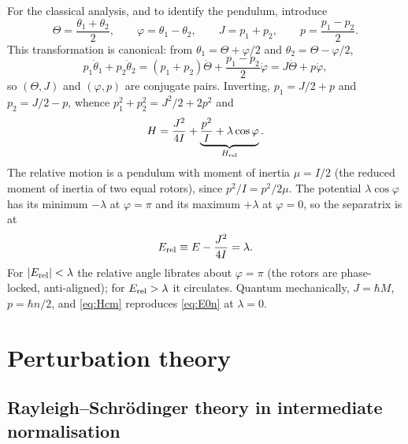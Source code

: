 \documentclass[preprint,12pt]{elsarticle}
\newcommand{\Erel}{E_{\rm rel}}
\begin{document}
For the classical analysis, and to identify the pendulum, introduce
\begin{equation}
\Theta=\frac{\theta_{1}+\theta_{2}}{2},\qquad
\varphi=\theta_{1}-\theta_{2},\qquad
J=p_{1}+p_{2},\qquad
p=\frac{p_{1}-p_{2}}{2}.
\label{eq:cmrel}
\end{equation}
This transformation is canonical: from $\theta_{1}=\Theta+\varphi/2$ and
$\theta_{2}=\Theta-\varphi/2$,
\begin{equation}
p_{1}\dot\theta_{1}+p_{2}\dot\theta_{2}
=(p_{1}+p_{2})\dot\Theta+\frac{p_{1}-p_{2}}{2}\dot\varphi
=J\dot\Theta+p\dot\varphi,
\end{equation}
so $(\Theta,J)$ and $(\varphi,p)$ are conjugate pairs. Inverting,
$p_{1}=J/2+p$ and $p_{2}=J/2-p$, whence
$p_{1}^{2}+p_{2}^{2}=J^{2}/2+2p^{2}$ and
\begin{equation}
H=\frac{J^{2}}{4I}+\underbrace{\frac{p^{2}}{I}+\lambda\cos\varphi}_{H_{\rm rel}} .
\label{eq:Hcm}
\end{equation}
The relative motion is a pendulum with moment of inertia $\mu=I/2$ (the reduced
moment of inertia of two equal rotors), since $p^{2}/I=p^{2}/2\mu$. The
potential $\lambda\cos\varphi$ has its minimum $-\lambda$ at $\varphi=\pi$ and
its maximum $+\lambda$ at $\varphi=0$, so the separatrix is at
\begin{equation}
\Erel\equiv E-\frac{J^{2}}{4I}=\lambda .
\label{eq:separatrix}
\end{equation}
For $|\Erel|<\lambda$ the relative angle librates about $\varphi=\pi$ (the
rotors are phase-locked, anti-aligned); for $\Erel>\lambda$ it circulates.
Quantum mechanically, $J=\hbar M$, $p=\hbar n/2$, and \eqref{eq:Hcm} reproduces
\eqref{eq:E0n} at $\lambda=0$.

\section{Perturbation theory}
\label{sec:pt}

\subsection{Rayleigh--Schr\"odinger theory in intermediate normalisation}
\end{document}

